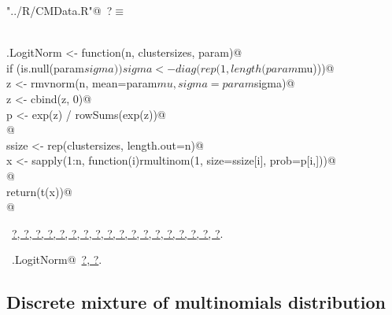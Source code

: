 \documentclass[reqno]{amsart}
\renewcommand{\NWtarget}[2]{\hypertarget{#1}{#2}}
\renewcommand{\NWlink}[2]{\hyperlink{#1}{#2}}
\begin{document}
\begin{flushleft} \small\label{scrap16}\raggedright\small
\NWtarget{nuweb?}{} \verb@"../R/CMData.R"@\nobreak\ {\footnotesize {?}}$\equiv$
\vspace{-1ex}
\begin{list}{}{} \item
\mbox{}\verb@@\\
\mbox{}\verb@mg.LogitNorm <- function(n, clustersizes, param){@\\
\mbox{}\verb@  if (is.null(param$sigma)) sigma <- diag(rep(1,length(param$mu)))@\\
\mbox{}\verb@  z <- rmvnorm(n, mean=param$mu, sigma=param$sigma)@\\
\mbox{}\verb@  z <- cbind(z, 0)@\\
\mbox{}\verb@  p <- exp(z) / rowSums(exp(z))@\\
\mbox{}\verb@  @\\
\mbox{}\verb@  ssize <- rep(clustersizes, length.out=n)@\\
\mbox{}\verb@  x <- sapply(1:n, function(i)rmultinom(1, size=ssize[i], prob=p[i,]))@\\
\mbox{}\verb@  @\\
\mbox{}\verb@  return(t(x))@\\
\mbox{}\verb@}@\\
\mbox{}\verb@@{\NWsep}
\end{list}
\vspace{-1.5ex}
\footnotesize
\begin{list}{}{\setlength{\itemsep}{-\parsep}\setlength{\itemindent}{-\leftmargin}}
\item \NWtxtFileDefBy\ \NWlink{nuweb?}{?}\NWlink{nuweb?}{, ?}\NWlink{nuweb?}{, ?}\NWlink{nuweb?}{, ?}\NWlink{nuweb?}{, ?}\NWlink{nuweb?}{, ?}\NWlink{nuweb?}{, ?}\NWlink{nuweb?}{, ?}\NWlink{nuweb?}{, ?}\NWlink{nuweb?}{, ?}\NWlink{nuweb?}{, ?}\NWlink{nuweb?}{, ?}\NWlink{nuweb?}{, ?}\NWlink{nuweb?}{, ?}\NWlink{nuweb?}{, ?}\NWlink{nuweb?}{, ?}\NWlink{nuweb?}{, ?}\NWlink{nuweb?}{, ?}.
\item \NWtxtIdentsDefed\nobreak\  \verb@mg.LogitNorm@\nobreak\ \NWlink{nuweb?}{?}\NWlink{nuweb?}{, ?}.
\item{}
\end{list}
\vspace{4ex}
\end{flushleft}
\subsection{Discrete mixture of multinomials distribution}
\end{document}
